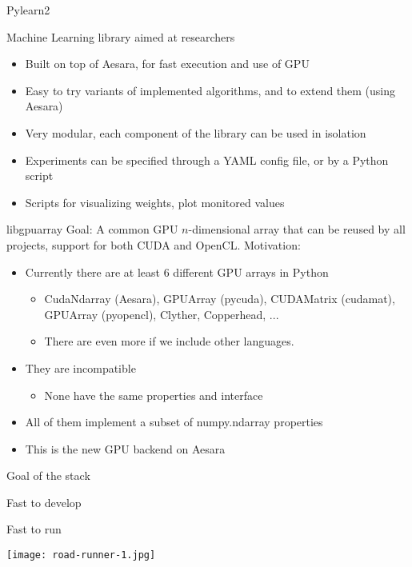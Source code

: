 \documentclass[utf8x,xcolor=pdftex,dvipsnames,table]{beamer}
\begin{document}
\begin{frame}{Pylearn2}

  Machine Learning library aimed at researchers

  \begin{itemize}
    \item Built on top of Aesara, for fast execution and use of GPU
    \item Easy to try variants of implemented algorithms, and to extend them (using Aesara)
    \item Very modular, each component of the library can be used in isolation
    \item Experiments can be specified through a YAML config file, or by a Python script
    \item Scripts for visualizing weights, plot monitored values
  \end{itemize}
\end{frame}


\begin{frame}{libgpuarray}
  Goal: A common GPU $n$-dimensional array that can be reused by all projects, support for both CUDA and OpenCL.
  \newline \newline
  Motivation:
  \begin{itemize}
  \item Currently there are at least 6 different GPU arrays in Python
    \begin{itemize}
    \item CudaNdarray (Aesara), GPUArray (pycuda), CUDAMatrix (cudamat), GPUArray (pyopencl), Clyther, Copperhead, ...
    \item There are even more if we include other languages.
    \end{itemize}
  \item They are incompatible
    \begin{itemize}
    \item None have the same properties and interface
    \end{itemize}
  \item All of them implement a subset of numpy.ndarray properties
  \item This is the new GPU backend on Aesara
  \end{itemize}
\end{frame}


\begin{frame}{Goal of the stack}
\begin{center}
\begin{bf}Fast to develop\end{bf}\newline \bigskip
\begin{bf}Fast to run\end{bf}\newline \bigskip
\hspace{-2.5cm}
\texttt{[image: road-runner-1.jpg]}
\end{center}
\end{frame}
\end{document}
